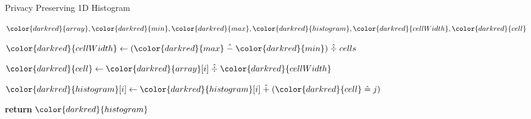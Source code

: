 \begin{algorithm}[H]
\caption{Privacy Preserving 1D Histogram}\label{a:1d-simple-histogram-numerical}
\begin{algorithmic}[1]
\renewcommand{\algorithmicrequire}{\textbf{Private Vars:}}
\Require ${\color{darkred}{array}}, {\color{darkred}{min}}, {\color{darkred}{max}}, {\color{darkred}{histogram}}, {\color{darkred}{cellWidth}}, {\color{darkred}{cell}}$


    \State ${\color{darkred}{cellWidth}} \gets ({\color{darkred}{max}} \hminus {\color{darkred}{min}}) \hdiv cells $


        \State ${\color{darkred}{cell}} \gets {\color{darkred}{array}}[i] \hdiv {\color{darkred}{cellWidth}}$


            \State ${\color{darkred}{histogram}}[i] \gets {\color{darkred}{histogram}}[i] \hplus ({\color{darkred}{cell}} \heq j)$

        \EndFor
    \EndFor
    \State \textbf{return} {${\color{darkred}{histogram}}$}
\EndProcedure
\end{algorithmic}
\end{algorithm}

